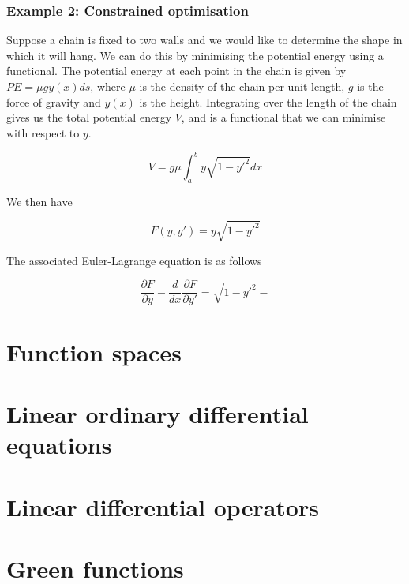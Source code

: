 \documentclass[]{article}
\begin{document}
\subsubsection{Example 2: Constrained optimisation}
Suppose a chain is fixed to two walls and we would like to determine the shape in which it will hang. We can do this by minimising the potential energy using a functional. The potential energy at each point in the chain is given by $PE = \mu gy(x) ds$, where $\mu$ is the density of the chain per unit length, $g$ is the force of gravity and $y(x)$ is the height. Integrating over the length of the chain gives us the total potential energy $V$, and is a functional that we can minimise with respect to $y$.

\begin{equation} V = g \mu \int_{a}^{b} y\sqrt{1-y'^{2}}dx \end{equation}

We then have

\begin{equation} F(y, y') = y\sqrt{1-y'^{2}}\end{equation}

The associated Euler-Lagrange equation is as follows

\begin{equation} \frac{\partial F}{\partial y} - \frac{d}{dx}\frac{\partial F}{\partial y'} = \sqrt{1-y'^{2}} -  \end{equation}


\nocite{*}




\section{Function spaces}

\section{Linear ordinary differential equations}

\section{Linear differential operators}

\section{Green functions}
\end{document}
